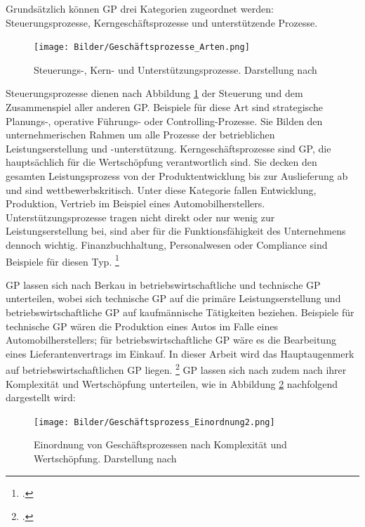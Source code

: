 Grundsätzlich können GP drei Kategorien zugeordnet werden: Steuerungsprozesse, Kerngeschäftsprozesse und unterstützende Prozesse.

\begin{figure}[H]
    \centering
    \texttt{[image: Bilder/Geschäftsprozesse\_Arten.png]}
    \caption[Steuerungs-, Kern- und Unterstützungsprozesse]{Steuerungs-, Kern- und Unterstützungsprozesse. Darstellung nach \cite[][S. 44]{theorie_gadatsch_grundkurs_geschäftsprozessmanagement_2010}}
    \label{fig:Geschäftsprozesse_Arten}
\end{figure}

Steuerungsprozesse dienen nach Abbildung \ref{fig:Geschäftsprozesse_Arten} der Steuerung und dem Zusammenspiel aller anderen GP. Beispiele für diese Art sind strategische Planungs-, operative Führungs- oder Controlling-Prozesse. Sie Bilden den unternehmerischen Rahmen um alle Prozesse der betrieblichen Leistungserstellung und -unterstützung. Kerngeschäftsprozesse sind GP, die hauptsächlich für die Wertschöpfung verantwortlich sind. Sie decken den gesamten Leistungsprozess von der Produktentwicklung bis zur Auslieferung ab und sind wettbewerbskritisch. Unter diese Kategorie fallen \zB Entwicklung, Produktion, Vertrieb im Beispiel eines Automobilherstellers. Unterstützungsprozesse tragen nicht direkt oder nur wenig zur Leistungserstellung bei, sind aber für die Funktionsfähigkeit des Unternehmens dennoch wichtig. Finanzbuchhaltung, Personalwesen oder Compliance sind Beispiele für diesen Typ. \footcite[Vgl.][S. 44]{theorie_gadatsch_grundkurs_geschäftsprozessmanagement_2010}

GP lassen sich nach Berkau in betriebswirtschaftliche und technische GP unterteilen, wobei sich technische GP auf die primäre Leistungserstellung und betriebswirtschaftliche GP auf kaufmännische Tätigkeiten beziehen. \parencite[Vgl.][S. 27]{theorie_berkau_arten_geschäftsprozesse_1998} Beispiele für technische GP wären die Produktion eines Autos im Falle eines Automobilherstellers; für betriebswirtschaftliche GP wäre es die Bearbeitung eines Lieferantenvertrags im Einkauf. In dieser Arbeit wird das Hauptaugenmerk auf betriebswirtschaftlichen GP liegen. \footcite[Vgl.][S. 10]{theorie_staud_geschäftsprozessanalyse_2006} GP lassen sich nach zudem nach ihrer Komplexität und Wertschöpfung unterteilen, wie in Abbildung \ref{fig:Geschäftsprozess_Einordnung2} nachfolgend dargestellt wird:

\begin{figure}[H]
    \centering
    \texttt{[image: Bilder/Geschäftsprozess\_Einordnung2.png]}
    \caption[Einordnung von Geschäftsprozessen nach Komplexität und Wertschöpfung]{Einordnung von Geschäftsprozessen nach Komplexität und Wertschöpfung. Darstellung nach \cite{theorie_riekhof_geschäftsprozess_einordnung_1997}}
    \label{fig:Geschäftsprozess_Einordnung2}
\end{figure}

